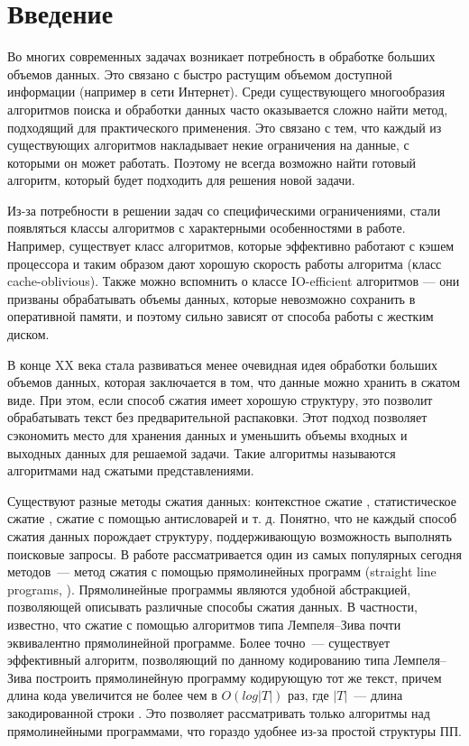 \documentclass[14pt]{article}
\begin{document}
\large
\begin{singlespace}
\tableofcontents
\newpage
\end{singlespace}


\section{Введение}

Во многих современных задачах возникает потребность в обработке больших объемов данных. Это связано с быстро растущим объемом
доступной информации (например в сети Интернет).
Среди существующего многообразия алгоритмов поиска и обработки данных часто оказывается сложно найти метод,
подходящий для практического применения. Это связано с тем, что каждый из существующих алгоритмов накладывает некие ограничения на данные,
с которыми он может работать. Поэтому не всегда возможно найти готовый алгоритм, который будет подходить для решения новой задачи.

Из-за потребности в решении задач со специфическими ограничениями, стали появляться классы алгоритмов
с характерными особенностями в работе. Например, существует класс алгоритмов, которые эффективно работают с кэшем процессора и таким образом дают хорошую скорость работы алгоритма (класс cache-oblivious). Также можно вспомнить о классе IO-efficient алгоритмов --- они призваны обрабатывать объемы данных, которые невозможно сохранить в оперативной памяти, и поэтому сильно зависят от способа работы с жестким диском.

В конце XX века стала развиваться менее очевидная идея обработки больших объемов данных, которая заключается в том, что данные можно хранить в сжатом виде.
При этом, если способ сжатия имеет хорошую структуру, это позволит обрабатывать текст без предварительной распаковки. Этот подход позволяет сэкономить место для хранения данных и уменьшить объемы входных и выходных данных для решаемой задачи. Такие алгоритмы называются алгоритмами над сжатыми представлениями.

Существуют разные методы сжатия данных: контекстное сжатие \cite{Welch} \cite{LZ}, статистическое сжатие \cite{Huffman}, сжатие с помощью антисловарей \cite{anti} и т. д. Понятно, что не каждый способ сжатия данных порождает структуру, поддерживающую возможность выполнять поисковые запросы.
В работе рассматривается один из самых популярных сегодня методов~--- метод сжатия с помощью прямолинейных
программ (straight line programs, \cite{Ritter}).
Прямолинейные программы являются удобной абстракцией, позволяющей описывать различные способы сжатия данных. В частности, известно, что 
сжатие с помощью алгоритмов типа Лемпеля--Зива почти эквивалентно прямолинейной программе. Более точно~--- существует эффективный алгоритм,
позволяющий по данному кодированию типа Лемпеля--Зива построить прямолинейную программу кодирующую тот же текст, причем длина кода увеличится не более чем в $O(log|T|)$ раз, где $|T|$~--- длина закодированной строки \cite{Ritter}.
Это позволяет рассматривать только алгоритмы над прямолинейными программами, что гораздо удобнее из-за простой структуры ПП.
\end{document}
